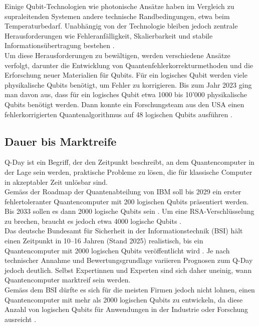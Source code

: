 \noindent
Einige Qubit-Technologien wie photonische Ansätze haben im Vergleich zu supraleitenden Systemen andere technische Randbedingungen, etwa beim Temperaturbedarf. 
Unabhängig von der Technologie bleiben jedoch zentrale Herausforderungen wie Fehleranfälligkeit, Skalierbarkeit und stabile Informationsübertragung bestehen \cite{weekly2025herausforderungen}.
\\
Um diese Herausforderungen zu bewältigen, werden verschiedene Ansätze verfolgt, darunter die Entwicklung von Quantenfehlerkorrekturmethoden und die Erforschung neuer Materialien für Qubits. 
Für ein logisches Qubit werden viele physikalische Qubits benötigt, um Fehler zu korrigieren.
Bis zum Jahr 2023 ging man davon aus, dass für ein logisches Qubit etwa 1000 bis 10'000 physikalische Qubits benötigt werden. 
Dann konnte ein Forschungsteam aus den USA einen fehlerkorrigierten Quantenalgorithmus auf 48 logischen Qubits ausführen \cite{spektrum2023quantenfehlerkorrektur}.
\pagebreak
\subsection{Dauer bis Marktreife}
Q-Day ist ein Begriff, der den Zeitpunkt beschreibt, an dem Quantencomputer in der Lage sein werden, 
praktische Probleme zu lösen, die für klassische Computer in akzeptabler Zeit unlösbar sind. 
\\
Gemäss der Roadmap der Quantenabteilung von IBM soll bis 2029 ein erster fehlertoleranter Quantencomputer mit 200 logischen Qubits präsentiert werden. 
Bis 2033 sollen es dann 2000 logische Qubits sein \cite{ct2025verschluesselung}. 
Um eine RSA-Verschlüsselung zu brechen, braucht es jedoch etwa 4000 logische Qubits \cite{qday2030}.
\\
Das deutsche Bundesamt für Sicherheit in der Informationstechnik (BSI) hält 
einen Zeitpunkt in 10--16 Jahren (Stand 2025) realistisch, bis ein Quantencomputer mit 2000 logischen Qubits veröffentlicht wird \cite{ct2025verschluesselung}.
Je nach technischer Annahme und Bewertungsgrundlage variieren Prognosen zum Q-Day jedoch deutlich.
Selbst Expertinnen und Experten sind sich daher uneinig, wann Quantencomputer marktreif sein werden.
\\
Gemäss dem BSI dürfte es sich für die meisten Firmen jedoch nicht lohnen, einen Quantencomputer mit mehr als 2000 logischen Qubits zu entwickeln, 
da diese Anzahl von logischen Qubits für Anwendungen in der Industrie oder Forschung ausreicht \cite{ct2025verschluesselung}.

